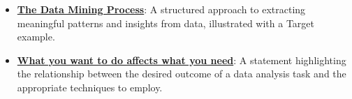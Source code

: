 \documentclass{article}%
\begin{document}
\begin{itemize}[leftmargin=*]
\item \href{https://purdue.brightspace.com/d2l/common/assets/pdfjs-d2l-dist/1.0.14-legacy/web/viewer.html?file=\%2Fcontent\%2Fenforced\%2F1095465-WL.202510.CS24200.LE1\%2F02L1-datas-intro.pdf\%3Fou\%3D1095465\&lang=en-us\&container=d2l-fileviewer-rendered-pdf\&fullscreen=d2l-fileviewer-rendered-pdf-dialog\&height=667#page=25}{\textbf{The Data Mining Process}}: A structured approach to extracting meaningful patterns and insights from data, illustrated with a Target example.%
\item \href{https://purdue.brightspace.com/d2l/common/assets/pdfjs-d2l-dist/1.0.14-legacy/web/viewer.html?file=\%2Fcontent\%2Fenforced\%2F1095465-WL.202510.CS24200.LE1\%2F02L1-datas-intro.pdf\%3Fou\%3D1095465\&lang=en-us\&container=d2l-fileviewer-rendered-pdf\&fullscreen=d2l-fileviewer-rendered-pdf-dialog\&height=667#page=27}{\textbf{What you want to do affects what you need}}: A statement highlighting the relationship between the desired outcome of a data analysis task and the appropriate techniques to employ.%
\end{itemize}%
\end{document}
